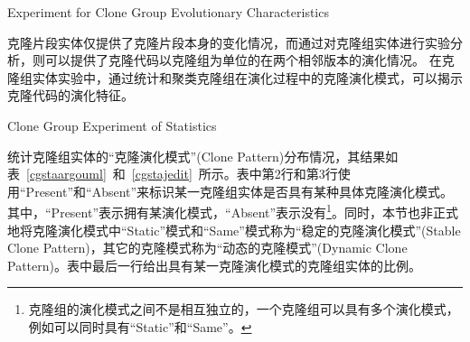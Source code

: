 
{Experiment for Clone Group Evolutionary Characteristics}

克隆片段实体仅提供了克隆片段本身的变化情况，而通过对克隆组实体进行实验分析，则可以提供了克隆代码以克隆组为单位的在两个相邻版本的演化情况。 在克隆组实体实验中，通过统计和聚类克隆组在演化过程中的克隆演化模式，可以揭示克隆代码的演化特征。

{Clone Group Experiment of Statistics} 

统计克隆组实体的“克隆演化模式”(Clone Pattern)分布情况，其结果如表~\ref{cgstaargouml}~和~\ref{cgstajedit}~所示。表中第2行和第3行使用“Present”和“Absent”来标识某一克隆组实体是否具有某种具体克隆演化模式。其中，“Present”表示拥有某演化模式，“Absent”表示没有\footnote{克隆组的演化模式之间不是相互独立的，一个克隆组可以具有多个演化模式，例如可以同时具有“Static”和“Same”。}。同时，本节也非正式地将克隆演化模式中“Static”模式和“Same”模式称为“稳定的克隆演化模式”(Stable Clone Pattern)，其它的克隆模式称为“动态的克隆模式”(Dynamic Clone Pattern)。表中最后一行给出具有某一克隆演化模式的克隆组实体的比例。


